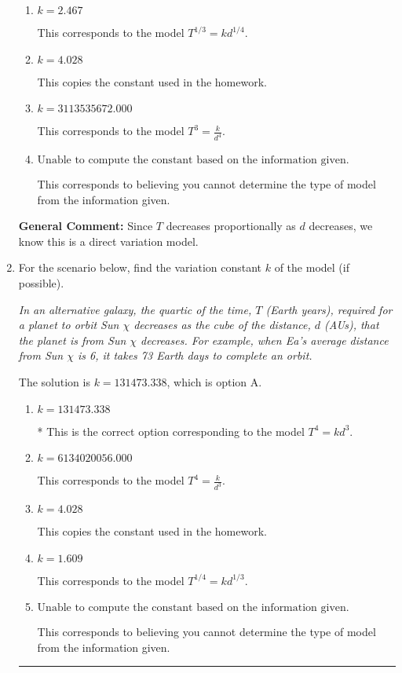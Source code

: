\documentclass{extbook}[14pt]
\newcommand{\litem}[1]{\item #1

\rule{\textwidth}{0.4pt}}
\begin{document}
\begin{enumerate}
{\begin{enumerate}[label=\Alph*.]
* This is the correct option corresponding to the model $T^{3} = k d^{4}$.
\item \( k = 2.467 \)

This corresponds to the model $T^{1/3} = k d^{1/4}$.
\item \( k = 4.028 \)

This copies the constant used in the homework.
\item \( k = 3113535672.000 \)

This corresponds to the model $T^{3} = \frac{k}{d^{4}}$.
\item \( \text{Unable to compute the constant based on the information given.} \)

This corresponds to believing you cannot determine the type of model from the information given.
\end{enumerate}

\textbf{General Comment:} Since $T$ decreases proportionally as $d$ decreases, we know this is a direct variation model.
}
\litem{
For the scenario below, find the variation constant $k$ of the model (if possible).

\begin{center}
    \textit{ In an alternative galaxy, the quartic of the time, $T$ (Earth years), required for a planet to orbit Sun $\chi$ decreases as the cube of the distance, $d$ (AUs), that the planet is from Sun $\chi$ decreases. For example, when Ea's average distance from Sun $\chi$ is 6, it takes 73 Earth days to complete an orbit. }
\end{center}
The solution is \( k = 131473.338 \), which is option A.\begin{enumerate}[label=\Alph*.]
\item \( k = 131473.338 \)

* This is the correct option corresponding to the model $T^{4} = k d^{3}$.
\item \( k = 6134020056.000 \)

This corresponds to the model $T^{4} = \frac{k}{d^{3}}$.
\item \( k = 4.028 \)

This copies the constant used in the homework.
\item \( k = 1.609 \)

This corresponds to the model $T^{1/4} = k d^{1/3}$.
\item \( \text{Unable to compute the constant based on the information given.} \)

This corresponds to believing you cannot determine the type of model from the information given.
\end{enumerate}

}
\end{enumerate}
\end{document}

